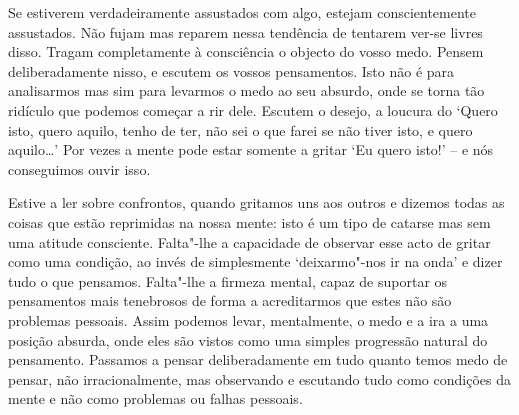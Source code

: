 Se estiverem verdadeiramente assustados com algo, estejam
conscientemente assustados. Não fujam mas reparem nessa tendência de
tentarem ver-se livres disso. Tragam completamente à consciência o objecto
do vosso medo. Pensem deliberadamente nisso, e escutem os vossos
pensamentos. Isto não é para analisarmos mas sim para levarmos o medo ao
seu absurdo, onde se torna tão ridículo que podemos começar a rir dele.
Escutem o desejo, a loucura do `Quero isto, quero aquilo, tenho de ter,
não sei o que farei se não tiver isto, e quero aquilo\ldots{}' Por
vezes a mente pode estar somente a gritar `Eu quero isto!' -- e nós
conseguimos ouvir isso.

Estive a ler sobre confrontos, quando gritamos uns aos outros e dizemos
todas as coisas que estão reprimidas na nossa
mente: isto é um tipo de catarse mas sem uma atitude consciente.
Falta"-lhe a capacidade de observar esse acto de gritar como uma
condição, ao invés de simplesmente `deixarmo"-nos ir na onda' e dizer
tudo o que pensamos. Falta"-lhe a firmeza mental, capaz de suportar os
pensamentos mais tenebrosos de forma a acreditarmos que estes não são
problemas pessoais. Assim podemos levar, mentalmente, o medo e a ira a
uma posição absurda, onde eles são vistos como uma simples progressão
natural do pensamento. Passamos a pensar deliberadamente em tudo quanto
temos medo de pensar, não irracionalmente, mas observando e escutando
tudo como condições da mente e não como problemas ou falhas pessoais.

